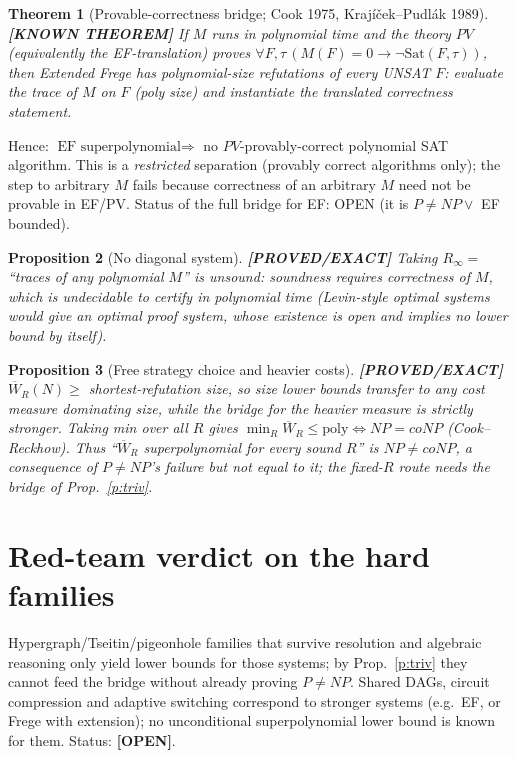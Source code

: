 \documentclass[11pt]{article}
\newtheorem{theorem}{Theorem}
\newtheorem{proposition}[theorem]{Proposition}
\newcommand{\status}[1]{\textbf{[#1]}}
\begin{document}
\begin{theorem}[Provable-correctness bridge; Cook 1975, Krajíček--Pudlák 1989]\status{KNOWN THEOREM}
If $M$ runs in polynomial time and the theory $PV$ (equivalently the EF-translation) proves
$\forall F,\tau\,(M(F)=0\to\neg\mathrm{Sat}(F,\tau))$, then Extended Frege has polynomial-size refutations
of every UNSAT $F$: evaluate the trace of $M$ on $F$ (poly size) and instantiate the
translated correctness statement.
\end{theorem}
Hence: $\text{EF superpolynomial}\Rightarrow$ no $PV$-provably-correct polynomial SAT algorithm.
This is a \emph{restricted} separation (provably correct algorithms only); the step to arbitrary $M$
fails because correctness of an arbitrary $M$ need not be provable in EF/PV. Status of the full bridge
for EF: OPEN (it is $P\ne NP\lor$ EF bounded).

\begin{proposition}[No diagonal system]\status{PROVED/EXACT}
Taking $R_\infty=$ ``traces of any polynomial $M$'' is unsound: soundness requires correctness of $M$,
which is undecidable to certify in polynomial time (Levin-style optimal systems would give an
optimal proof system, whose existence is open and implies no lower bound by itself).
\end{proposition}

\begin{proposition}[Free strategy choice and heavier costs]\status{PROVED/EXACT}
$\overline W_R(N)\ge$ shortest-refutation size, so size lower bounds transfer to any cost measure
dominating size, while the bridge for the heavier measure is strictly stronger. Taking min over all
$R$ gives $\min_R\overline W_R\le\mathrm{poly}\iff NP=coNP$ (Cook--Reckhow). Thus
``$\overline W_R$ superpolynomial for \emph{every} sound $R$'' is $NP\neq coNP$, a consequence of $P\ne NP$'s
failure but not equal to it; the fixed-$R$ route needs the bridge of Prop.~\ref{p:triv}.
\end{proposition}

\section{Red-team verdict on the hard families}
Hypergraph/Tseitin/pigeonhole families that survive resolution and algebraic reasoning only yield
lower bounds for those systems; by Prop.~\ref{p:triv} they cannot feed the bridge without already
proving $P\ne NP$. Shared DAGs, circuit compression and adaptive switching correspond to
stronger systems (e.g.\ EF, or Frege with extension); no unconditional superpolynomial lower bound
is known for them. Status: \status{OPEN}.
\end{document}
